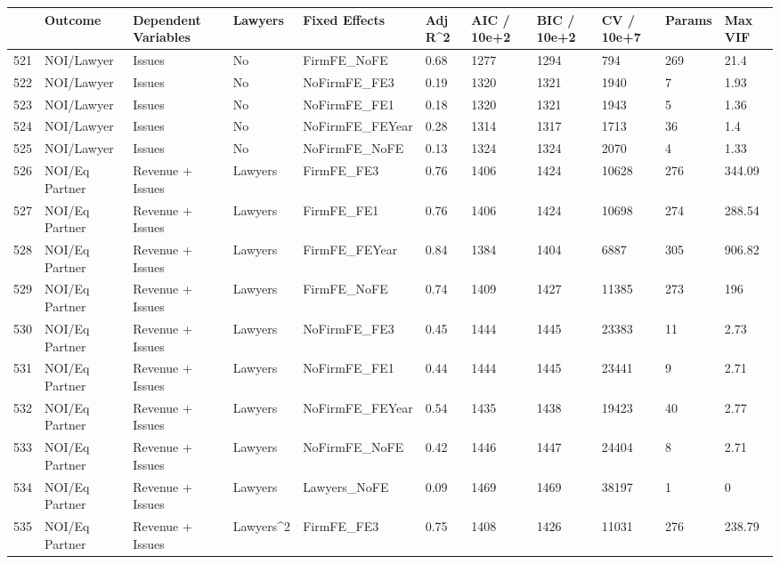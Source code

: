 \documentclass{article}
\begin{document}
\begin{table}[H]
\centering
\begin{tabular}{rllllllllll}
  \hline
 & Outcome & Dependent Variables & Lawyers & Fixed Effects & Adj R^2 & AIC / 10e+2 & BIC / 10e+2 & CV / 10e+7 & Params & Max VIF \\ 
  \hline
521 & NOI/Lawyer & Issues & No & FirmFE\_NoFE & 0.68 & 1277 & 1294 & 794 & 269 & 21.4 \\ 
  522 & NOI/Lawyer & Issues & No & NoFirmFE\_FE3 & 0.19 & 1320 & 1321 & 1940 & 7 & 1.93 \\ 
  523 & NOI/Lawyer & Issues & No & NoFirmFE\_FE1 & 0.18 & 1320 & 1321 & 1943 & 5 & 1.36 \\ 
  524 & NOI/Lawyer & Issues & No & NoFirmFE\_FEYear & 0.28 & 1314 & 1317 & 1713 & 36 & 1.4 \\ 
  525 & NOI/Lawyer & Issues & No & NoFirmFE\_NoFE & 0.13 & 1324 & 1324 & 2070 & 4 & 1.33 \\ 
  526 & NOI/Eq Partner & Revenue + Issues & Lawyers & FirmFE\_FE3 & 0.76 & 1406 & 1424 & 10628 & 276 & 344.09 \\ 
  527 & NOI/Eq Partner & Revenue + Issues & Lawyers & FirmFE\_FE1 & 0.76 & 1406 & 1424 & 10698 & 274 & 288.54 \\ 
  528 & NOI/Eq Partner & Revenue + Issues & Lawyers & FirmFE\_FEYear & 0.84 & 1384 & 1404 & 6887 & 305 & 906.82 \\ 
  529 & NOI/Eq Partner & Revenue + Issues & Lawyers & FirmFE\_NoFE & 0.74 & 1409 & 1427 & 11385 & 273 & 196 \\ 
  530 & NOI/Eq Partner & Revenue + Issues & Lawyers & NoFirmFE\_FE3 & 0.45 & 1444 & 1445 & 23383 & 11 & 2.73 \\ 
  531 & NOI/Eq Partner & Revenue + Issues & Lawyers & NoFirmFE\_FE1 & 0.44 & 1444 & 1445 & 23441 & 9 & 2.71 \\ 
  532 & NOI/Eq Partner & Revenue + Issues & Lawyers & NoFirmFE\_FEYear & 0.54 & 1435 & 1438 & 19423 & 40 & 2.77 \\ 
  533 & NOI/Eq Partner & Revenue + Issues & Lawyers & NoFirmFE\_NoFE & 0.42 & 1446 & 1447 & 24404 & 8 & 2.71 \\ 
  534 & NOI/Eq Partner & Revenue + Issues & Lawyers & Lawyers\_NoFE & 0.09 & 1469 & 1469 & 38197 & 1 & 0 \\ 
  535 & NOI/Eq Partner & Revenue + Issues & Lawyers^2 & FirmFE\_FE3 & 0.75 & 1408 & 1426 & 11031 & 276 & 238.79 \\ 

\end{tabular}
\end{table}
\end{document}
